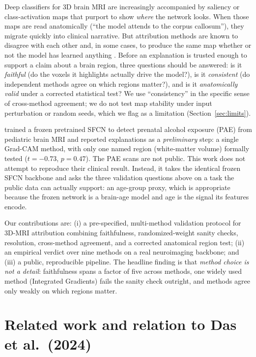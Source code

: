 \documentclass[11pt]{article}
\begin{document}
Deep classifiers for 3D brain MRI are increasingly accompanied by saliency or
class-activation maps that purport to show \emph{where} the network looks. When those maps
are read anatomically (``the model attends to the corpus callosum''), they migrate
quickly into clinical narrative. But attribution methods are known to disagree with each
other and, in some cases, to produce the same map whether or not the model has learned
anything \citep{adebayo2018}. Before an explanation is trusted enough to support a claim
about a brain region, three questions should be answered: is it \emph{faithful} (do the
voxels it highlights actually drive the model?), is it \emph{consistent} (do independent
methods agree on which regions matter?), and is it \emph{anatomically valid} under a corrected
statistical test? We use ``consistency'' in the specific sense of cross-method agreement; we
do not test map stability under input perturbation or random seeds, which we flag as a
limitation (Section~\ref{sec:limits}).

\citet{das2024} trained a frozen pretrained SFCN to detect prenatal alcohol exposure (PAE)
from pediatric brain MRI and reported explanations as a \emph{preliminary} step: a single
Grad-CAM method, with only one named region (white-matter volume) formally tested
($t=-0.73$, $p=0.47$). The PAE scans are not public. This work does not attempt to reproduce
their clinical result. Instead, it takes the identical frozen SFCN backbone and asks the
three validation questions above on a task the public data can actually support: an
age-group proxy, which is appropriate because the frozen network is a brain-age model and
age is the signal its features encode.

Our contributions are: (i) a pre-specified, multi-method validation protocol for 3D-MRI
attribution combining faithfulness, randomized-weight sanity checks, resolution, cross-method
agreement, and a corrected anatomical region test; (ii) an empirical verdict over nine
methods on a real neuroimaging backbone; and (iii) a public, reproducible pipeline. The
headline finding is that \emph{method choice is not a detail}: faithfulness spans a factor of
five across methods, one widely used method (Integrated Gradients) fails the sanity check
outright, and methods agree only weakly on which regions matter.

\section{Related work and relation to Das et al.\ (2024)}
\end{document}

